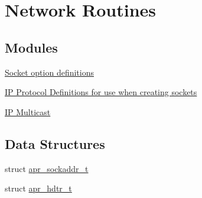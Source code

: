 \hypertarget{group__apr__network__io}{}\section{Network Routines}
\label{group__apr__network__io}
\subsection*{Modules}
\begin{DoxyCompactItemize}
\item 
\hyperlink{group__apr__sockopt}{Socket option definitions}
\item 
\hyperlink{group___i_p___proto}{I\+P Protocol Definitions for use when creating sockets}
\item 
\hyperlink{group__apr__mcast}{I\+P Multicast}
\end{DoxyCompactItemize}
\subsection*{Data Structures}
\begin{DoxyCompactItemize}
\item 
struct \hyperlink{structapr__sockaddr__t}{apr\+\_\+sockaddr\+\_\+t}
\item 
struct \hyperlink{structapr__hdtr__t}{apr\+\_\+hdtr\+\_\+t}
\end{DoxyCompactItemize}

